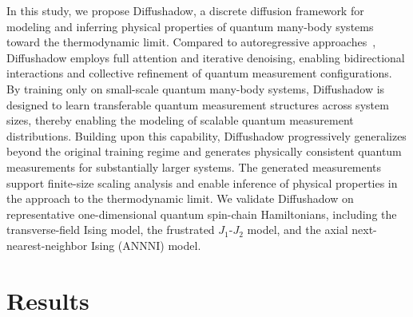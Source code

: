 \documentclass[pdflatex,sn-mathphys-num]{sn-jnl}%
\theoremstyle{thmstyleone}%
\theoremstyle{thmstyletwo}%
\theoremstyle{thmstylethree}%
\begin{document}
In this study, we propose Diffushadow, a discrete diffusion framework \cite{ho2020denoising, austin2021structured, nie2026large} for modeling and inferring physical properties of quantum many-body systems toward the thermodynamic limit. Compared to autoregressive approaches~\cite{sharir2020deep, yao2024shadowgpt}, Diffushadow employs full attention and iterative denoising, enabling bidirectional interactions and collective refinement of quantum measurement configurations. By training only on small-scale quantum many-body systems, Diffushadow is designed to learn transferable quantum measurement structures across system sizes, thereby enabling the modeling of scalable quantum measurement distributions. Building upon this capability, Diffushadow progressively generalizes beyond the original training regime and generates physically consistent quantum measurements for substantially larger systems. The generated measurements support finite-size scaling analysis and enable inference of physical properties in the approach to the thermodynamic limit. We validate Diffushadow on representative one-dimensional quantum spin-chain Hamiltonians, including the transverse-field Ising model, the frustrated $J_1$-$J_2$ model, and the axial next-nearest-neighbor Ising (ANNNI) model.





\section{Results}\label{sec2}
\end{document}
